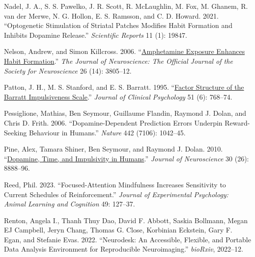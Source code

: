 \documentclass{article}
\newlength{\cslhangindent}
\newlength{\cslentryspacingunit} %
\newenvironment{CSLReferences}[2] %
 {%
  \setlength{\parindent}{0pt}
  \ifodd #1
  \let\oldpar\par
  \def\par{\hangindent=\cslhangindent\oldpar}
  \fi
  \setlength{\parskip}{#2\cslentryspacingunit}
 }%
 {}
\begin{document}
\begin{CSLReferences}{1}{0}
\leavevmode{}%
Nadel, J. A., S. S. Pawelko, J. R. Scott, R. McLaughlin, M. Fox, M.
Ghanem, R. van der Merwe, N. G. Hollon, E. S. Ramsson, and C. D. Howard.
2021. {``Optogenetic Stimulation of Striatal Patches Modifies Habit
Formation and Inhibits Dopamine Release.''} \emph{Scientific Reports} 11
(1): 19847.

\leavevmode{}%
Nelson, Andrew, and Simon Killcross. 2006.
{``\href{https://www.ncbi.nlm.nih.gov/pmc/articles/PMC6674135}{Amphetamine
Exposure Enhances Habit Formation}.''} \emph{The Journal of
Neuroscience: The Official Journal of the Society for Neuroscience} 26
(14): 3805--12.

\leavevmode{}%
Patton, J. H., M. S. Stanford, and E. S. Barratt. 1995.
{``\href{https://www.ncbi.nlm.nih.gov/pubmed/8778124}{Factor Structure
of the {Barratt} Impulsiveness Scale}.''} \emph{Journal of Clinical
Psychology} 51 (6): 768--74.

\leavevmode{}%
Pessiglione, Mathias, Ben Seymour, Guillaume Flandin, Raymond J. Dolan,
and Chris D. Frith. 2006. {``Dopamine-Dependent Prediction Errors
Underpin Reward-Seeking Behaviour in Humans.''} \emph{Nature} 442
(7106): 1042--45.

\leavevmode{}%
Pine, Alex, Tamara Shiner, Ben Seymour, and Raymond J. Dolan. 2010.
{``\href{https://www.ncbi.nlm.nih.gov/pubmed/20592211}{Dopamine, {Time},
and {Impulsivity} in {Humans}}.''} \emph{Journal of Neuroscience} 30
(26): 8888--96.

\leavevmode{}%
Reed, Phil. 2023. {``Focused-Attention Mindfulness Increases Sensitivity
to Current Schedules of Reinforcement.''} \emph{Journal of Experimental
Psychology: Animal Learning and Cognition} 49: 127--37.

\leavevmode{}%
Renton, Angela I., Thanh Thuy Dao, David F. Abbott, Saskia Bollmann,
Megan EJ Campbell, Jeryn Chang, Thomas G. Close, Korbinian Eckstein,
Gary F. Egan, and Stefanie Evas. 2022. {``Neurodesk: {An} Accessible,
Flexible, and Portable Data Analysis Environment for Reproducible
Neuroimaging.''} \emph{bioRxiv}, 2022--12.


\end{CSLReferences}
\end{document}
